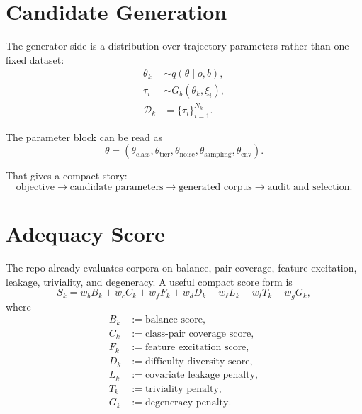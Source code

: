 \documentclass[11pt]{article}
\begin{document}
\section{Candidate Generation}
The generator side is a distribution over trajectory parameters rather than one fixed dataset:
\begin{align}
\theta_k &\sim q(\theta \mid o, b), \\
\tau_i &\sim G_b(\theta_k, \xi_i), \\
\mathcal{D}_k &= \{\tau_i\}_{i=1}^{N_k}.
\end{align}

The parameter block can be read as
\begin{equation}
\theta =
(\theta_{\text{class}},
\theta_{\text{tier}},
\theta_{\text{noise}},
\theta_{\text{sampling}},
\theta_{\text{env}}).
\end{equation}

That gives a compact story:
\begin{equation}
\text{objective}
\rightarrow
\text{candidate parameters}
\rightarrow
\text{generated corpus}
\rightarrow
\text{audit and selection}.
\end{equation}

\section{Adequacy Score}
The repo already evaluates corpora on balance, pair coverage, feature excitation, leakage, triviality, and degeneracy. A useful compact score form is
\begin{equation}
S_k
=
w_b B_k
+ w_c C_k
+ w_f F_k
+ w_d D_k
- w_\ell L_k
- w_t T_k
- w_g G_k,
\end{equation}
where
\begin{align}
B_k &:= \text{balance score}, \\
C_k &:= \text{class-pair coverage score}, \\
F_k &:= \text{feature excitation score}, \\
D_k &:= \text{difficulty-diversity score}, \\
L_k &:= \text{covariate leakage penalty}, \\
T_k &:= \text{triviality penalty}, \\
G_k &:= \text{degeneracy penalty}.
\end{align}
\end{document}
